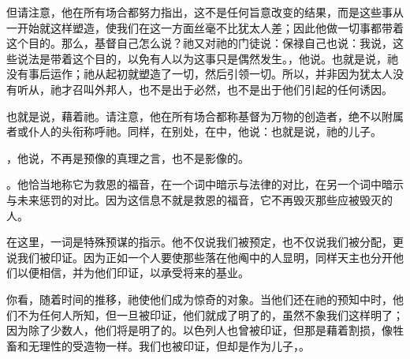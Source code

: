 但请注意，他在所有场合都努力指出，这不是任何旨意改变的结果，而是这些事从一开始就这样塑造，使我们在这一方面丝毫不比犹太人差；因此他做一切事都带着这个目的。那么，基督自己怎么说？祂又对祂的门徒说：保禄自己也说：我说，这些说法是带着这个目的，以免有人以为这事只是偶然发生。，他说。也就是说，祂没有事后运作；祂从起初就塑造了一切，然后引领一切。所以，并非因为犹太人没有听从，祂才召叫外邦人，也不是出于必然，也不是出于他们引起的任何诱因。\par

\par

也就是说，藉着祂。请注意，他在所有场合都称基督为万物的创造者，绝不以附属者或仆人的头衔称呼祂。同样，在别处，在中，他说：也就是说，祂的儿子。\par

，他说，不再是预像的真理之言，也不是影像的。\par

。他恰当地称它为救恩的福音，在一个词中暗示与法律的对比，在另一个词中暗示与未来惩罚的对比。因为这信息不就是救恩的福音，它不再毁灭那些应被毁灭的人。\par

\par

在这里，一词是特殊预谋的指示。他不仅说我们被预定，也不仅说我们被分配，更说我们被印证。因为正如一个人要使那些落在他阄中的人显明，同样天主也分开他们以便相信，并为他们印证，以承受将来的基业。\par

你看，随着时间的推移，祂使他们成为惊奇的对象。当他们还在祂的预知中时，他们不为任何人所知，但一旦被印证，他们就成了明了的，虽然不象我们这样明了；因为除了少数人，他们将是明了的。以色列人也曾被印证，但那是藉着割损，像牲畜和无理性的受造物一样。我们也被印证，但却是作为儿子，。\par

